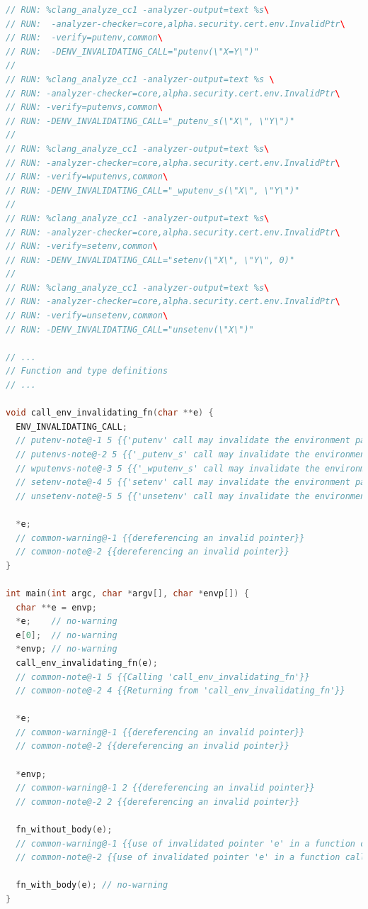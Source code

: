 \begin{lstlisting}[language={C++}]
// RUN: %clang_analyze_cc1 -analyzer-output=text %s\
// RUN:  -analyzer-checker=core,alpha.security.cert.env.InvalidPtr\
// RUN:  -verify=putenv,common\
// RUN:  -DENV_INVALIDATING_CALL="putenv(\"X=Y\")"
//
// RUN: %clang_analyze_cc1 -analyzer-output=text %s \
// RUN: -analyzer-checker=core,alpha.security.cert.env.InvalidPtr\
// RUN: -verify=putenvs,common\
// RUN: -DENV_INVALIDATING_CALL="_putenv_s(\"X\", \"Y\")"
//
// RUN: %clang_analyze_cc1 -analyzer-output=text %s\
// RUN: -analyzer-checker=core,alpha.security.cert.env.InvalidPtr\
// RUN: -verify=wputenvs,common\
// RUN: -DENV_INVALIDATING_CALL="_wputenv_s(\"X\", \"Y\")"
//
// RUN: %clang_analyze_cc1 -analyzer-output=text %s\
// RUN: -analyzer-checker=core,alpha.security.cert.env.InvalidPtr\
// RUN: -verify=setenv,common\
// RUN: -DENV_INVALIDATING_CALL="setenv(\"X\", \"Y\", 0)"
//
// RUN: %clang_analyze_cc1 -analyzer-output=text %s\
// RUN: -analyzer-checker=core,alpha.security.cert.env.InvalidPtr\
// RUN: -verify=unsetenv,common\
// RUN: -DENV_INVALIDATING_CALL="unsetenv(\"X\")"

// ...
// Function and type definitions
// ...

void call_env_invalidating_fn(char **e) {
  ENV_INVALIDATING_CALL;
  // putenv-note@-1 5 {{'putenv' call may invalidate the environment parameter of 'main'}}
  // putenvs-note@-2 5 {{'_putenv_s' call may invalidate the environment parameter of 'main'}}
  // wputenvs-note@-3 5 {{'_wputenv_s' call may invalidate the environment parameter of 'main'}}
  // setenv-note@-4 5 {{'setenv' call may invalidate the environment parameter of 'main'}}
  // unsetenv-note@-5 5 {{'unsetenv' call may invalidate the environment parameter of 'main'}}

  *e;
  // common-warning@-1 {{dereferencing an invalid pointer}}
  // common-note@-2 {{dereferencing an invalid pointer}}
}

int main(int argc, char *argv[], char *envp[]) {
  char **e = envp;
  *e;    // no-warning
  e[0];  // no-warning
  *envp; // no-warning
  call_env_invalidating_fn(e);
  // common-note@-1 5 {{Calling 'call_env_invalidating_fn'}}
  // common-note@-2 4 {{Returning from 'call_env_invalidating_fn'}}

  *e;
  // common-warning@-1 {{dereferencing an invalid pointer}}
  // common-note@-2 {{dereferencing an invalid pointer}}

  *envp;
  // common-warning@-1 2 {{dereferencing an invalid pointer}}
  // common-note@-2 2 {{dereferencing an invalid pointer}}

  fn_without_body(e);
  // common-warning@-1 {{use of invalidated pointer 'e' in a function call}}
  // common-note@-2 {{use of invalidated pointer 'e' in a function call}}

  fn_with_body(e); // no-warning
}
\end{lstlisting}


